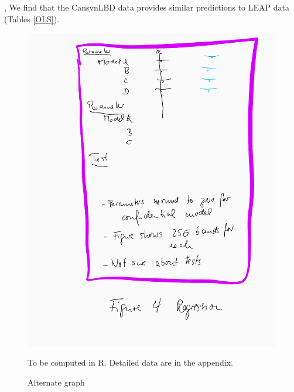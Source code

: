 , We find that the CansynLBD data provides similar predictions to LEAP data (Tables  \ref{OLS}). 



\begin{figure} [H]
\centering
\label{tab:all:estimates}
\includegraphics[width=.8\linewidth]{graphs/Figure4-placeholder.png} 
\caption{Alternate graph} 
\begin{minipage}{0.48\linewidth}
{\footnotesize To be computed in R. Detailed data are in the appendix. \par}
\end{minipage}
\end{figure}